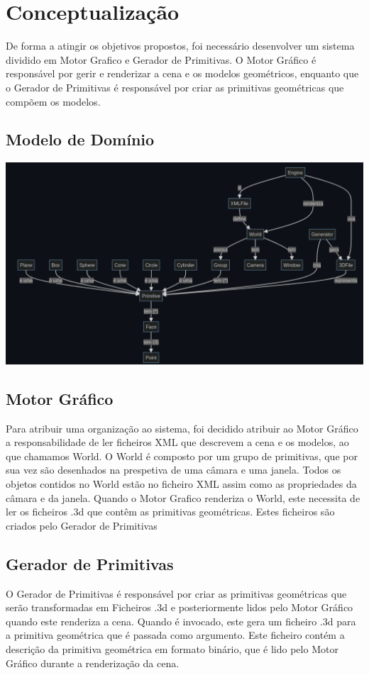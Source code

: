 \section{Conceptualização}

De forma a atingir os objetivos propostos, foi necessário desenvolver um sistema
dividido em Motor Grafico e Gerador de Primitivas. O Motor Gráfico é responsável
por gerir e renderizar a cena e os modelos geométricos, enquanto que o Gerador de Primitivas
é responsável por criar as primitivas geométricas que compõem os modelos. 


\subsection{Modelo de Domínio}

\includegraphics[width=15cm]{ModeloDominio.png}\\[\bigskipamount]

\subsection{Motor Gráfico}

Para atribuir uma organização ao sistema, foi decidido atribuir ao Motor Gráfico a
responsabilidade de ler ficheiros XML que descrevem a cena e os modelos, ao que chamamos 
World. O World é composto por um grupo de primitivas, que por sua vez são
desenhados na prespetiva de uma câmara e uma janela. Todos os objetos contidos no World
estão no ficheiro XML assim como as propriedades da câmara e da janela.
Quando o Motor Grafico renderiza o World, este necessita de ler os ficheiros .3d que
contêm as primitivas geométricas. Estes ficheiros são criados pelo Gerador de Primitivas

\subsection{Gerador de Primitivas}

O Gerador de Primitivas é responsável por criar as primitivas geométricas que serão
transformadas em Ficheiros .3d e posteriormente lidos pelo Motor Gráfico
quando este renderiza a cena. Quando é invocado, este gera um ficheiro .3d para a
primitiva geométrica que é passada como argumento. Este ficheiro contém a descrição
da primitiva geométrica em formato binário, que é lido pelo Motor Gráfico durante a
renderização da cena.

